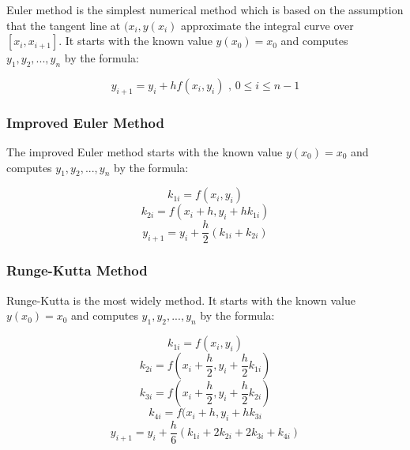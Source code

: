 Euler method is the simplest numerical method which is based on the assumption that the tangent line at $(x_i, y(x_i)$ approximate the integral curve over $[x_i, x_{i+1}]$. It starts with the known value $y(x_0) = x_0$ and computes $y_1, y_2,...,y_n$ by the formula:

$$y_{i+1} = y_i + hf(x_i, y_i) \text{ , }0\leq i\leq n-1$$

\subsubsection{Improved Euler Method}

The improved Euler method starts with the known value $y(x_0) = x_0$ and computes $y_1, y_2,...,y_n$ by the formula:

$$k_{1i} = f(x_i, y_i)$$
$$k_{2i} = f(x_i + h, y_i + hk_{1i})$$
$$y_{i+1} = y_i + \frac{h}{2}(k_{1i} + k_{2i})$$

\subsubsection{Runge-Kutta Method}

Runge-Kutta is the most widely method. It starts with the known value $y(x_0) = x_0$ and computes $y_1, y_2,...,y_n$ by the formula:

$$k_{1i} = f(x_i, y_i)$$
$$k_{2i} = f(x_i + \frac{h}{2}, y_i + \frac{h}{2}k_{1i})$$
$$k_{3i} = f(x_i + \frac{h}{2}, y_i + \frac{h}{2}k_{2i})$$
$$k_{4i} = f(x_i + h, y_i + hk_{3i}$$
$$y_{i+1} = y_i + \frac{h}{6}(k_{1i} + 2k_{2i} + 2k_{3i} + k_{4i})$$
